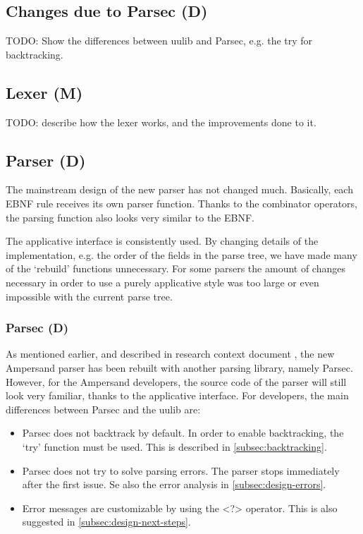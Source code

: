 \subsection{Changes due to Parsec (D)}
TODO: Show the differences between uulib and Parsec, e.g. the try for backtracking.

\subsection{Lexer (M)}
\label{subsec:lexer}
TODO: describe how the lexer works, and the improvements done to it.

\subsection{Parser (D)}
\label{subsec:design-parser}
The mainstream design of the new parser has not changed much.
Basically, each EBNF rule receives its own parser function.
Thanks to the combinator operators, the parsing function also looks very similar to the EBNF.

The applicative interface is consistently used.
By changing details of the implementation, e.g. the order of the fields in the parse tree, we have made many of the `rebuild' functions unnecessary.
For some parsers the amount of changes necessary in order to use a purely applicative style was too large or even impossible with the current parse tree.

\subsubsection{Parsec (D)}
\label{subsec:design-parsing-lib}
As mentioned earlier, and described in research context document , the new Ampersand parser has been rebuilt with another parsing library, namely Parsec.
However, for the Ampersand developers, the source code of the parser will still look very familiar, thanks to the applicative interface.
For developers, the main differences between Parsec and the uulib are:
\begin{itemize}
  \item Parsec does not backtrack by default.
    In order to enable backtracking, the `try' function must be used.
    This is described in \autoref{subsec:backtracking}.
  \item Parsec does not try to solve parsing errors.
    The parser stops immediately after the first issue.
    Se also the error analysis in \autoref{subsec:design-errors}.
  \item Error messages are customizable by using the <?> operator.
    This is also suggested in \autoref{subsec:design-next-steps}.
\end{itemize}

